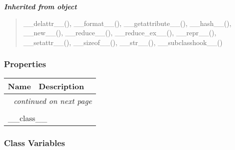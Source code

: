 \large{\textbf{\textit{Inherited from object}}}

\begin{quote}
\_\_delattr\_\_(), \_\_format\_\_(), \_\_getattribute\_\_(), \_\_hash\_\_(), \_\_new\_\_(), \_\_reduce\_\_(), \_\_reduce\_ex\_\_(), \_\_repr\_\_(), \_\_setattr\_\_(), \_\_sizeof\_\_(), \_\_str\_\_(), \_\_subclasshook\_\_()
\end{quote}


  \subsubsection{Properties}

    \vspace{-1cm}
\hspace{\varindent}\begin{longtable}{|p{\varnamewidth}|p{\vardescrwidth}|l}
\cline{1-2}
\cline{1-2} \centering \textbf{Name} & \centering \textbf{Description}& \\
\cline{1-2}
\endhead\cline{1-2}\multicolumn{3}{r}{\small\textit{continued on next page}}\\\endfoot\cline{1-2}
\endlastfoot\multicolumn{2}{|l|}{\textit{Inherited from object}}\\
\multicolumn{2}{|p{\varwidth}|}{\raggedright \_\_class\_\_}\\
\cline{1-2}
\end{longtable}



  \subsubsection{Class Variables}

